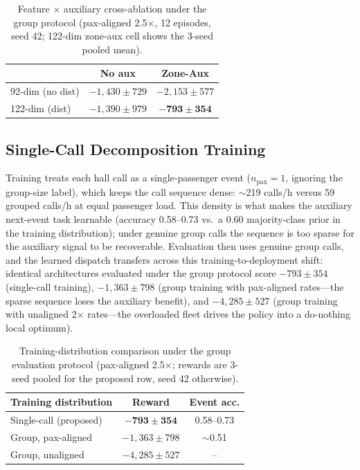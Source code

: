 \documentclass[conference]{IEEEtran}
\begin{document}
\begin{table}[t]
\centering
\caption{Feature $\times$ auxiliary cross-ablation under the group
protocol (pax-aligned 2.5$\times$, 12 episodes, seed 42; 122-dim
zone-aux cell shows the 3-seed pooled mean).}
\label{tab:synergy}
\begin{tabular}{@{}lcc@{}}
\toprule
 & No aux & Zone-Aux \\
\midrule
92-dim (no dist) & $-1{,}430 \pm 729$ & $-2{,}153 \pm 577$ \\
122-dim (dist)   & $-1{,}390 \pm 979$ & $\mathbf{-793 \pm 354}$ \\
\bottomrule
\end{tabular}
\end{table}

\subsection{Single-Call Decomposition Training}

Training treats each hall call as a single-passenger event
($n_{\text{pax}} = 1$, ignoring the group-size label), which keeps
the call sequence dense: $\sim$219 calls/h versus 59 grouped
calls/h at equal passenger load. This density is what makes the
auxiliary next-event task learnable (accuracy 0.58--0.73 vs.~a 0.60
majority-class prior in the training distribution); under genuine group calls the sequence is too sparse for the
auxiliary signal to be recoverable. Evaluation then uses genuine
group calls, and the learned dispatch transfers across this
training-to-deployment shift: identical architectures evaluated under
the group protocol score $-793 \pm 354$ (single-call training),
$-1{,}363 \pm 798$ (group training with pax-aligned rates---the
sparse sequence loses the auxiliary benefit), and $-4{,}285 \pm
527$ (group training with unaligned 2$\times$ rates---the overloaded
fleet drives the policy into a do-nothing local optimum).

\begin{table}[t]
\centering
\caption{Training-distribution comparison under the group evaluation
protocol (pax-aligned 2.5$\times$; rewards are 3-seed pooled for the
proposed row, seed 42 otherwise).}
\label{tab:train_dist}
\begin{tabular}{@{}lcc@{}}
\toprule
Training distribution & Reward & Event acc. \\
\midrule
Single-call (proposed) & $\mathbf{-793 \pm 354}$ & 0.58--0.73 \\
Group, pax-aligned & $-1{,}363 \pm 798$ & $\sim$0.51 \\
Group, unaligned & $-4{,}285 \pm 527$ & -- \\
\bottomrule
\end{tabular}
\end{table}
\end{document}
